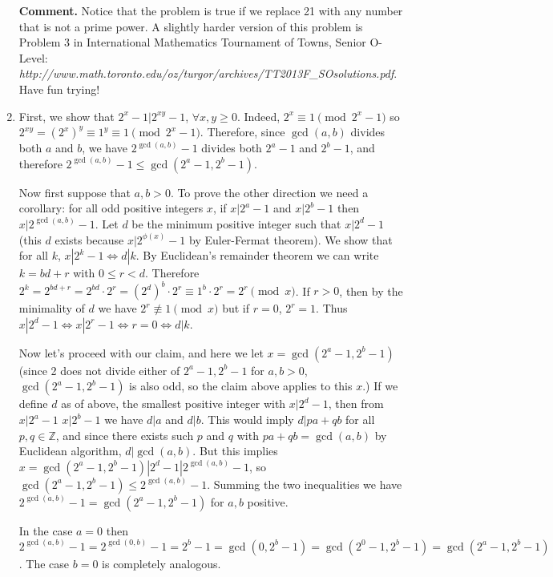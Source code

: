 \documentclass[11pt]{article}
\begin{document}
\begin{enumerate}
\textbf {Comment.} Notice that the problem is true if we replace 21 with any number that is not a prime power. A slightly harder version of this problem is Problem 3 in International Mathematics Tournament of Towns, Senior O-Level:\\ \emph{http://www.math.toronto.edu/oz/turgor/archives/TT2013F\_SOsolutions.pdf}. Have fun trying!

\item First, we show that $2^x-1|2^{xy}-1$, $\forall x, y\ge 0$. Indeed, $2^x\equiv 1\pmod {2^x-1}$ so $2^{xy}=(2^x)^{y}\equiv 1^y\equiv 1\pmod {2^x-1}$. Therefore, since $\gcd (a,b)$ divides both $a$ and $b$, we have $2^{\gcd(a,b)}-1$ divides both $2^a-1$ and $2^b-1$, and therefore $2^{\gcd (a,b)}-1\le \gcd (2^a-1, 2^b-1)$.

Now first suppose that $a,b>0$. To prove the other direction we need a corollary: for all odd positive integers $x$, if $x|2^a-1$ and $x|2^b-1$ then $x|2^{\gcd (a,b)}-1$. Let $d$ be the minimum positive integer such that $x|2^d-1$ (this $d$ exists because $x|2^{\phi (x)}-1$ by Euler-Fermat theorem). We show that for all $k$, $x|2^k-1\Leftrightarrow d|k$. By Euclidean's remainder theorem we can write $k=bd+r$ with $0\le r<d$. Therefore $2^k=2^{bd+r} = 2^{bd}\cdot 2^r = (2^d)^b\cdot 2^r \equiv 1^b\cdot 2^r=2^r\pmod {x}$. If $r>0$, then by the minimality of $d$ we have $2^r\not\equiv 1\pmod {x}$ but if $r=0$, $2^r=1$. Thus $x|2^d-1\Leftrightarrow x|2^r-1\Leftrightarrow r=0\Leftrightarrow d|k$.

Now let's proceed with our claim, and here we let $x=\gcd (2^a-1, 2^b-1)$ (since 2 does not divide either of $2^a-1, 2^b-1$ for $a,b>0$, $\gcd (2^a-1, 2^b-1)$ is also odd, so the claim above applies to this $x$.) If we define $d$ as of above, the smallest positive integer with $x|2^d-1$, then from $x|2^a-1$ $x|2^b-1$ we have $d|a$ and $d|b$. This would imply $d|pa+qb$ for all $p,q\in\mathbb{Z}$, and since there exists such $p$ and $q$ with $pa+qb=\gcd (a,b)$ by Euclidean algorithm, $d|\gcd (a,b)$. But this implies $x=\gcd (2^a-1, 2^b-1)|2^d-1|2^{\gcd (a,b)}-1$, so $\gcd (2^a-1, 2^b-1)\le 2^{\gcd (a,b)}-1$. Summing the two inequalities we have $2^{\gcd (a,b)}-1= \gcd (2^a-1, 2^b-1)$ for $a,b$ positive.

In the case $a=0$ then $2^{\gcd (a,b)}-1=2^{\gcd (0,b)}-1=2^b-1=\gcd (0, 2^b-1)=\gcd (2^0-1, 2^b-1)=\gcd (2^a-1, 2^b-1)$. The case $b=0$ is completely analogous.

\end{enumerate}
\end{document}
